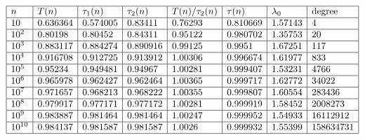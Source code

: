 \documentclass[11pt]{article}
\theoremstyle{definition}
\theoremstyle{remark}
\numberwithin{equation}{section}
\begin{document}
\begin{table}[h]
$$\begin{array}{|l|l|l|l|l|l|l|l|}
\hline
n & T(n) & \tau_1(n) & \tau_2(n) & T(n)/\tau_2(n) & \tau(n) & \lambda_0 & \text{degree}\\
\hline 
10 &  0.636364 & 0.574005 & 0.83411 & 0.76293 & 0.810669 & 1.57143 & 4\\
\hline
10^2 & 0.80198 & 0.80452 & 0.84311 & 0.95122 & 0.980702 & 1.35753 & 20\\
\hline
10^3 & 0.883117 & 0.884274 & 0.890916 & 0.99125 & 0.9951 & 1.67251 & 117\\
\hline
10^4 & 0.916708 & 0.912725 & 0.913912 & 1.00306 & 0.996674 & 1.61977 & 833\\
\hline
10^5 & 0.95234 & 0.949481 & 0.94967 & 1.00281 & 0.999407 & 1.53231 & 4766\\
\hline
10^6 & 0.965978 & 0.962427 & 0.962464 & 1.00365 & 0.999717 & 1.62772 & 34022\\
\hline
10^7 & 0.971657 & 0.968213 & 0.968222 & 1.00355 & 0.999807 & 1.60554 & 283436\\
\hline 
10^8 & 0.979917 & 0.977171 & 0.977172 & 1.00281 & 0.999919 & 1.58452 & 2008273\\
\hline
10^9 & 0.983887 & 0.981464 & 0.981464 & 1.00247 & 0.999952 & 1.54933 & 16112912\\
\hline
10^{10} & 0.984137 & 0.981587 & 0.981587 & 1.0026 & 0.999932 & 1.55399 & 158634731\\
\hline
\end{array}$$
\caption{Values of $T(n)$, $\tau_1(n),\tau_2(n),\tau(n)$, $\lambda_0$ and degree$(x)$ for $x=12n+8$.}\label{tabtetan8}
\end{table}

\newpage
\end{document}
